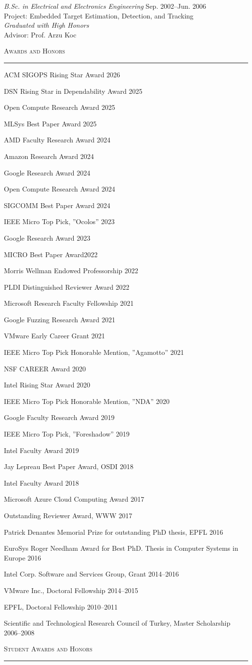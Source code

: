 \documentclass[10pt]{article}
\newcommand{\mysec}[1]{%
  \par\addvspace{2em}%
  \Needspace{8\baselineskip}%
  \noindent\textsc{\large #1}\par\vspace{1mm}\hrule\vspace{2mm}%
}
\newcommand{\myssub}[1]{%
  \par\begingroup
    \leftskip=2mm\relax
    \noindent #1\par
  \endgroup
  \vspace{1mm}%
}
\newenvironment{keepblock}{\par\Needspace{4\baselineskip}\noindent}{\par}
\begin{document}
\myssub{\textit{B.Sc. in Electrical and Electronics Engineering} \hfill Sep. 2002--Jun. 2006 \\
Project: Embedded Target Estimation, Detection, and Tracking\\
{\textit{Graduated with High Honors}} \\
Advisor: Prof. Arzu Koc}

\mysec{Awards and Honors}
\begin{keepblock}
\myssub{ACM SIGOPS Rising Star Award \hfill 2026}
\myssub{DSN Rising Star in Dependability Award \hfill 2025}
\myssub{Open Compute Research Award \hfill 2025}
\myssub{MLSys Best Paper Award \hfill 2025}
\myssub{AMD Faculty Research  Award \hfill 2024}
\myssub{Amazon Research Award \hfill 2024}
\myssub{Google Research Award \hfill 2024}
\myssub{Open Compute Research Award \hfill 2024}
\myssub{SIGCOMM Best Paper Award \hfill 2024}
\myssub{IEEE Micro Top Pick, ''Ocolos'' \hfill 2023}
\myssub{Google Research Award \hfill 2023}
\end{keepblock}
\myssub{MICRO Best Paper Award\hfill 2022}
\myssub{Morris Wellman Endowed Professorship \hfill 2022}
\myssub{PLDI Distinguished Reviewer Award \hfill 2022}
\myssub{Microsoft Research Faculty Fellowship \hfill 2021}
\myssub{Google Fuzzing Research Award \hfill 2021}
\myssub{VMware Early Career Grant \hfill 2021}
\myssub{IEEE Micro Top Pick Honorable Mention, ''Agamotto'' \hfill 2021}
\myssub{NSF CAREER Award \hfill 2020}
\myssub{Intel Rising Star Award \hfill 2020}
\myssub{IEEE Micro Top Pick Honorable Mention, ''NDA'' \hfill 2020}
\myssub{Google Faculty Research Award \hfill 2019}
\myssub{IEEE Micro Top Pick, ''Foreshadow'' \hfill 2019}
\myssub{Intel Faculty Award \hfill 2019}
\myssub{Jay Lepreau Best Paper Award, OSDI \hfill 2018}
\myssub{Intel Faculty Award \hfill 2018}
\myssub{Microsoft Azure Cloud Computing Award \hfill 2017}
\myssub{Outstanding Reviewer Award, WWW \hfill 2017}
\myssub{Patrick Denantes Memorial Prize for outstanding PhD thesis, EPFL \hfill 2016}
\myssub{EuroSys Roger Needham Award for Best PhD. Thesis in Computer Systems in Europe \hfill 2016}
\myssub{Intel Corp. Software and Services Group, Grant \hfill 2014--2016}
\myssub{VMware Inc., Doctoral Fellowship \hfill 2014--2015}
\myssub{EPFL, Doctoral Fellowship \hfill 2010--2011}
\myssub{Scientific and Technological Research Council of Turkey, Master Scholarship \hfill 2006--2008}


\mysec{Student Awards and Honors}
\end{document}

